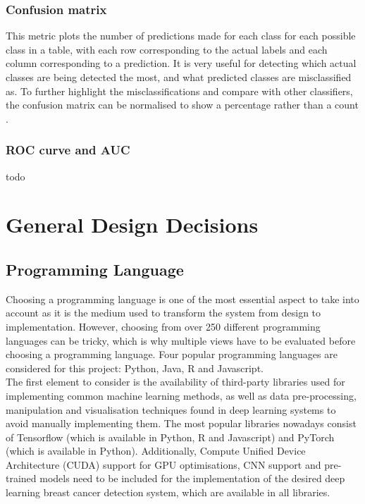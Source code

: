 \subsubsection{Confusion matrix} This metric plots the number of predictions made for each class for each possible class in a table, with each row corresponding to the actual labels and each column corresponding to a prediction. It is very useful for detecting which actual classes are being detected the most, and what predicted classes are misclassified as. To further highlight the misclassifications and compare with other classifiers, the confusion matrix can be normalised to show a percentage rather than a count \citep{Geron2019}.

\subsubsection{ROC curve and AUC}

todo


\section{General Design Decisions}

\subsection{Programming Language}

Choosing a programming language is one of the most essential aspect to take into account as it is the medium used to transform the system from design to implementation. However, choosing from over 250 different programming languages \citep{tiobe} can be tricky, which is why multiple views have to be evaluated before choosing a programming language. Four popular programming languages are considered for this project: Python, Java, R and  Javascript.\\

The first element to consider is the availability of third-party libraries used for implementing common machine learning methods, as well as data pre-processing, manipulation and visualisation techniques found in deep learning systems to avoid manually implementing them. The most popular libraries nowadays consist of Tensorflow (which is available in Python, R and Javascript) and PyTorch (which is available in Python). Additionally, Compute Unified Device Architecture (CUDA) support for GPU optimisations, CNN support and pre-trained models need to be included for the implementation of the desired deep learning breast cancer detection system, which are available in all libraries.\\

